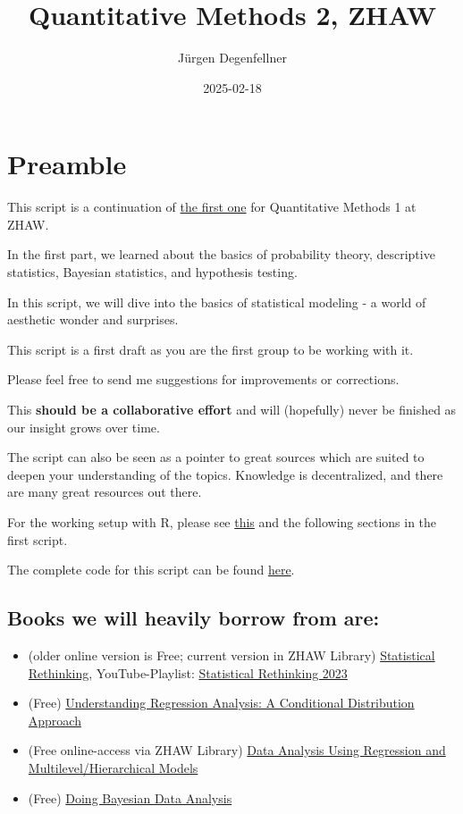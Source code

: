 \documentclass[
]{book}
\title{Quantitative Methods 2, ZHAW}
\author{Jürgen Degenfellner}
\date{2025-02-18}
\providecommand{\tightlist}{%
  \setlength{\itemsep}{0pt}\setlength{\parskip}{0pt}}
\begin{document}
\maketitle

{
\setcounter{tocdepth}{1}
\tableofcontents
}
\chapter{Preamble}\label{intro0}

This script is a continuation of
\href{https://jdegenfellner.github.io/Script_QM1_ZHAW/}{the first one} for Quantitative Methods 1
at ZHAW.

In the first part, we learned about the basics of probability theory,
descriptive statistics, Bayesian statistics, and hypothesis testing.

In this script, we will dive into the basics of statistical modeling -
a world of aesthetic wonder and surprises.

This script is a first draft as you are the first group to be working with it.

Please feel free to send me suggestions for improvements or corrections.

This \textbf{should be a collaborative effort} and will (hopefully)
never be finished as our insight grows over time.

The script can also be seen as a pointer to great sources which are
suited to deepen your understanding of the topics. Knowledge is decentralized,
and there are many great resources out there.

For the working setup with R, please
see \href{https://jdegenfellner.github.io/Script_QM1_ZHAW/index.html\#section}{this}
and the following sections in the first script.

The complete code for this script can be found
\href{https://github.com/jdegenfellner/Script_QM2_ZHAW}{here}.

\section{Books we will heavily borrow from are:}\label{books-we-will-heavily-borrow-from-are}

\begin{itemize}
\tightlist
\item
  (older online version is Free; current version in ZHAW Library) \href{https://civil.colorado.edu/~balajir/CVEN6833/bayes-resources/RM-StatRethink-Bayes.pdf}{Statistical Rethinking}, YouTube-Playlist: \href{https://youtu.be/FdnMWdICdRs?si=q2py5QVY_L299hEa}{Statistical Rethinking 2023}
\item
  (Free) \href{https://vdoc.pub/documents/understanding-regression-analysis-a-conditional-distribution-approach-84oqjr8sqva0}{Understanding Regression Analysis: A Conditional Distribution Approach}
\item
  (Free online-access via ZHAW Library) \href{http://www.stat.columbia.edu/~gelman/arm/}{Data Analysis Using Regression and Multilevel/Hierarchical Models}
\item
  (Free) \href{https://nyu-cdsc.github.io/learningr/assets/kruschke_bayesian_in_R.pdf}{Doing Bayesian Data Analysis}
\end{itemize}
\end{document}
